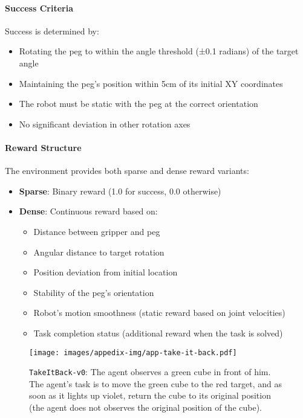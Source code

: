 \paragraph{Success Criteria} Success is determined by:
\begin{itemize}
    \item Rotating the peg to within the angle threshold (±0.1 radians) of the target angle
    \item Maintaining the peg's position within 5cm of its initial XY coordinates
    \item The robot must be static with the peg at the correct orientation
    \item No significant deviation in other rotation axes
\end{itemize}

\paragraph{Reward Structure} The environment provides both sparse and dense reward variants:
\begin{itemize}
    \item \textbf{Sparse}: Binary reward (1.0 for success, 0.0 otherwise)
    \item \textbf{Dense}: Continuous reward based on:
    \begin{itemize}
        \item Distance between gripper and peg
        \item Angular distance to target rotation
        \item Position deviation from initial location
        \item Stability of the peg's orientation
        \item Robot's motion smoothness (static reward based on joint velocities)
        \item Task completion status (additional reward when the task is solved)
    \end{itemize}
\end{itemize}

\newpage
\begin{figure*}[h!]
    \centering
    \texttt{[image: images/appedix-img/app-take-it-back.pdf]}
    \vspace{-15pt}
    \caption{\texttt{TakeItBack-v0}: The agent observes a green cube in front of him. The agent's task is to move the green cube to the red target, and as soon as it lights up violet, return the cube to its original position (the agent does not observes the original position of the cube).}
    \label{fig:app-take-it-back}
    \vspace{-15pt}
\end{figure*}
